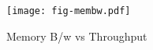 \begin{figure}[t]
\texttt{[image: fig-membw.pdf]}
\caption{Memory B/w vs Throughput}
\label{fig:membw}
\end{figure}
